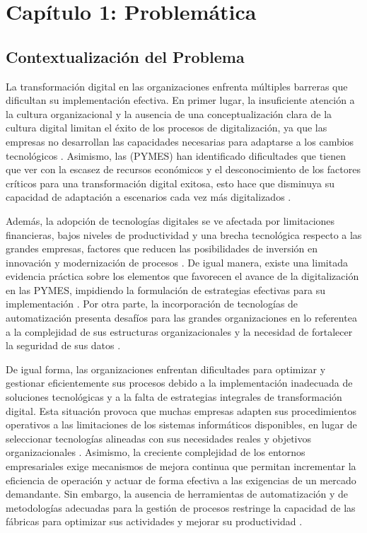 \chapter{Capítulo 1: Problemática}
\section{Contextualización del Problema}

La transformación digital en las organizaciones enfrenta múltiples barreras que dificultan su implementación efectiva. En primer lugar, la insuficiente atención a la cultura organizacional y la ausencia de una conceptualización clara de la cultura digital limitan el éxito de los procesos de digitalización, ya que las empresas no desarrollan las capacidades necesarias para adaptarse a los cambios tecnológicos \parencite{grover2022}. Asimismo, las (PYMES) han identificado dificultades que tienen que ver con la escasez de recursos económicos y el desconocimiento de los factores críticos para una transformación digital exitosa, esto hace que disminuya su capacidad de adaptación a escenarios cada vez más digitalizados \parencite{jewapatarakul2024}.

Además, la adopción de tecnologías digitales se ve afectada por limitaciones financieras, bajos niveles de productividad y una brecha tecnológica respecto a las grandes empresas, factores que reducen las posibilidades de inversión en innovación y modernización de procesos \parencite{clemente2024}. De igual manera, existe una limitada evidencia práctica sobre los elementos que favorecen el avance de la digitalización en las PYMES, impidiendo la formulación de estrategias efectivas para su implementación \parencite{hoang2024}. Por otra parte, la incorporación de tecnologías de automatización presenta desafíos para las grandes organizaciones en lo referentea a la complejidad de sus estructuras organizacionales y la necesidad de fortalecer la seguridad de sus datos \parencite{hurtado2024}.


De igual forma, las organizaciones  enfrentan dificultades para optimizar y gestionar eficientemente sus procesos debido a la implementación inadecuada de soluciones tecnológicas y a la falta de estrategias integrales de transformación digital. Esta situación provoca que muchas empresas adapten sus procedimientos operativos a las limitaciones de los sistemas informáticos disponibles, en lugar de seleccionar tecnologías alineadas con sus necesidades reales y objetivos organizacionales \parencite{munoz2023}. Asimismo, la creciente complejidad de los entornos empresariales exige mecanismos de mejora continua que permitan incrementar la eficiencia de operación y actuar de forma efectiva a las exigencias de un mercado demandante. Sin embargo, la ausencia de herramientas de automatización y de metodologías adecuadas para la gestión de procesos restringe la capacidad de las fábricas para optimizar sus actividades y mejorar su productividad \parencite{polyvyanyy2021}.

